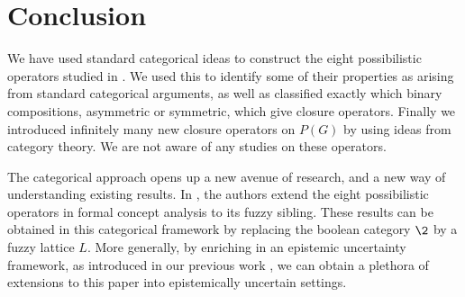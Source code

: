 

\section{Conclusion}

We have used standard categorical ideas to construct the eight possibilistic operators studied in \cite{dubois-dupin-prade_2007,dubois-prade_2009}. We used this to identify some of their properties as arising from standard categorical arguments, as well as classified exactly which binary compositions, asymmetric or symmetric, which give closure operators. Finally we introduced infinitely many new closure operators on $P(G)$ by using ideas from category theory. We are not aware of any studies on these operators. 

The categorical approach opens up a new avenue of research, and a new way of understanding existing results. In \cite{djouadi_prade_2011}, the authors extend the eight possibilistic operators in formal concept analysis to its fuzzy sibling. These results can be obtained in this categorical framework by replacing the boolean category $\2$ by a fuzzy lattice $L$. More generally, by enriching in an epistemic uncertainty framework, as introduced in our previous work \cite{aambo_2026}, we can obtain a plethora of extensions to this paper into epistemically uncertain settings. 


